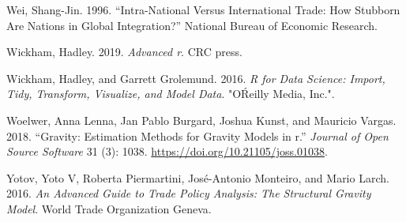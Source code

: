\documentclass[12pt,reqno,oneside,pdftex]{formato-puc/puctesis} %
\newenvironment{CSLReferences}
  {}
  {\par}
\begin{document}
\begin{CSLReferences}{1}{0}
\leavevmode\hypertarget{ref-wei1996intra}{}%
Wei, Shang-Jin. 1996. {``Intra-National Versus International Trade: How
Stubborn Are Nations in Global Integration?''} National Bureau of
Economic Research.

\leavevmode\hypertarget{ref-wickham2019advanced}{}%
Wickham, Hadley. 2019. \emph{Advanced r}. CRC press.

\leavevmode\hypertarget{ref-wickham2016r}{}%
Wickham, Hadley, and Garrett Grolemund. 2016. \emph{R for Data Science:
Import, Tidy, Transform, Visualize, and Model Data}. "OŔeilly Media,
Inc.".

\leavevmode\hypertarget{ref-Woelver2018}{}%
Woelwer, Anna Lenna, Jan Pablo Burgard, Joshua Kunst, and Mauricio
Vargas. 2018. {``Gravity: Estimation Methods for Gravity Models in r.''}
\emph{Journal of Open Source Software} 31 (3): 1038.
\url{https://doi.org/10.21105/joss.01038}.

\leavevmode\hypertarget{ref-yotov2016advanced}{}%
Yotov, Yoto V, Roberta Piermartini, José-Antonio Monteiro, and Mario
Larch. 2016. \emph{An Advanced Guide to Trade Policy Analysis: The
Structural Gravity Model}. World Trade Organization Geneva.

\end{CSLReferences}
\end{document}
